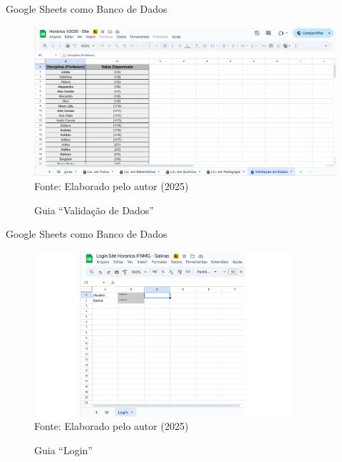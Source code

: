 \begin{frame}{Google Sheets como Banco de Dados}
    \begin{figure}
        \centering
        \vspace{-0.5cm}
        \caption{Guia ``Validação de Dados''}
        \vspace{-0.2cm}
        \includegraphics[width=1\textwidth]{figuras/plan-3.png}
        \\ %
        \footnotesize Fonte: Elaborado pelo autor (2025)
    \end{figure}
\end{frame}

\begin{frame}{Google Sheets como Banco de Dados}
    \begin{figure}
        \centering
        \vspace{-0.5cm}
        \caption{Guia ``Login''}
        \vspace{-0.2cm}
        \includegraphics[width=0.85\textwidth]{figuras/plan-4.png}
        \\ %
        \footnotesize Fonte: Elaborado pelo autor (2025)
    \end{figure}
\end{frame}

